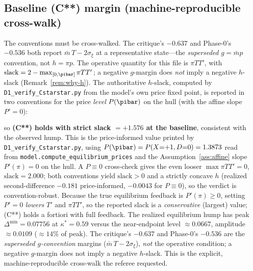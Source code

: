 \subsection*{Baseline (C**) margin (machine-reproducible cross-walk)}

The conventions must be cross-walked. The critique's $-0.637$ and Phase-0's
$-0.536$ both report $\bar m\,T-2\sigma_\xi$ at a representative state---the
\emph{superseded $g=\bar m p$} convention, not $h=\pi p$. The operative
quantity for this file is $\pi T T'$, with
$\mathrm{slack}=2-\max_{[0,\pibar]}\pi T T'$; a negative $g$-margin does
\emph{not} imply a negative $h$-slack (Remark~\ref{rem:why-h}). The authoritative
$h$-slack, computed by \texttt{D1\_verify\_Cstarstar.py} from the model's own
price fixed point, is reported in two conventions for the price \emph{level}
$P(\pibar)$ on the hull (with the affine slope $P'=0$):
\begin{center}\end{center}
so \textbf{(C**) holds with strict slack $=+1.576$ at the baseline}, consistent
with the observed hump. This is the price-informed value printed by
\texttt{D1\_verify\_Cstarstar.py}, using $P(\pibar)=P(X{=}{+}1,D{=}0)=1.3873$
read from \texttt{model.compute\_equilibrium\_prices} and the
Assumption~\ref{ass:affine} slope $P'(\pi)=0$ on the hull. A $P\equiv0$
cross-check gives the even looser $\max\pi T T'=0$, $\mathrm{slack}=2.000$;
both conventions yield $\mathrm{slack}>0$ and a strictly concave $h$ (realized
second-difference $-0.181$ price-informed, $-0.0043$ for $P\equiv0$), so the
verdict is convention-robust. Because the true equilibrium feedback is
$P'(\pi)\ge0$, setting $P'=0$ \emph{lowers} $T'$ and $\pi T T'$, so the reported
slack is a \emph{conservative} (largest) value; (C**) holds a fortiori with full
feedback. The realized equilibrium hump has peak $\Delta^{\min}=0.07756$ at
$\kappa^\ast=0.59$ versus the near-endpoint level $\approx0.0667$, amplitude
$\approx0.0109$ ($\approx14\%$ of peak). The critique's $-0.637$ and Phase-0's
$-0.536$ are the \emph{superseded $g$-convention} margins
($\bar m\,T-2\sigma_\xi$), \emph{not} the operative condition; a negative
$g$-margin does not imply a negative $h$-slack. This is the explicit,
machine-reproducible cross-walk the referee requested.


